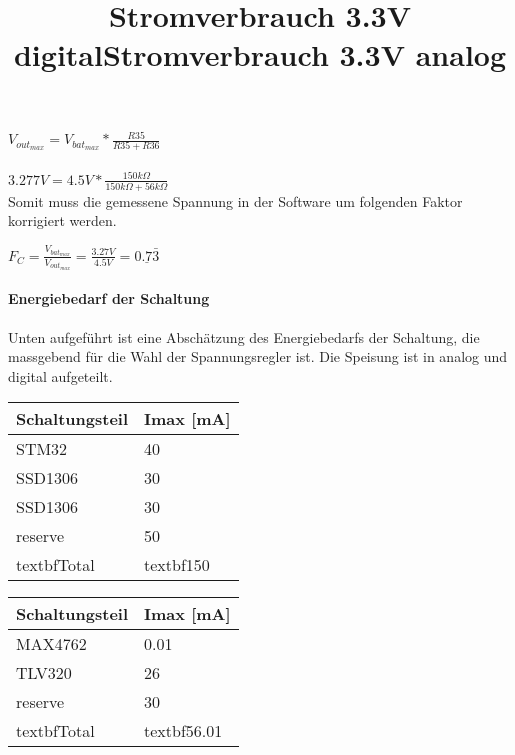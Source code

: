 ${V_{out_{max}} = V_{bat_{max}}*\frac{R35}{R35+R36}}$\\
\\
${3.277\si{V} = 4.5\si{V}*\frac{150\si{k\Omega}}{150\si{k\Omega}+56\si{k\Omega}}}$\\

Somit muss die gemessene Spannung in der Software um folgenden Faktor korrigiert werden.

${F_C=\frac{V_{bat_{max}}}{V_{out_{max}}}=\frac{3.27\si{V}}{4.5\si{V}}=\underline{0.7\bar{3}}}$

\paragraph{Energiebedarf der Schaltung}

Unten aufgeführt ist eine Abschätzung des Energiebedarfs der Schaltung, die massgebend für die Wahl der Spannungsregler ist. Die Speisung ist in analog und digital aufgeteilt.

\begin{table}[H]
\title{Stromverbrauch 3.3V digital}
\centering
\begin{tabular}{|l|l|}
\hline
\textbf{Schaltungsteil} & \textbf{Imax {[}\si{mA}{]}} \\ \hline
STM32                   & 40                     \\ \hline
SSD1306                 & 30                     \\ \hline
SSD1306                 & 30                     \\ \hline
reserve                 & 50                     \\ \hline
textbf{Total}           & textbf{150}            \\ \hline
\end{tabular}
\end{table}

\begin{table}[H]
\title{Stromverbrauch 3.3V analog}
\centering
\begin{tabular}{|l|l|}
\hline
\textbf{Schaltungsteil} & \textbf{Imax {[}\si{mA}{]}} \\ \hline
MAX4762                 & 0.01                   \\ \hline
TLV320                  & 26                     \\ \hline
reserve                 & 30                     \\ \hline
textbf{Total}           & textbf{56.01}          \\ \hline
\end{tabular}
\end{table}

